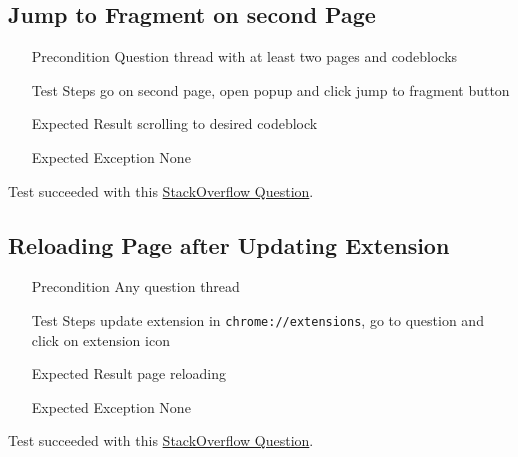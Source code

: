\documentclass{report}
\begin{document}
\subsection*{Jump to Fragment on second Page}
\begin{itemize}
	\item[Precondition] Question thread with at least two pages and codeblocks
	\item[Test Steps] go on second page, open popup and click jump to fragment button
	\item[Expected Result] scrolling to desired codeblock
	\item[Expected Exception] None
\end{itemize}
Test succeeded with this \href{https://stackoverflow.com/questions/221294/how-do-you-get-a-timestamp-in-javascript?page=2}{StackOverflow Question}.

\subsection*{Reloading Page after Updating Extension}
\begin{itemize}
	\item[Precondition] Any question thread
	\item[Test Steps] update extension in \texttt{chrome://extensions}, go to question and click on extension icon
	\item[Expected Result] page reloading
	\item[Expected Exception] None
\end{itemize}
Test succeeded with this \href{https://stackoverflow.com/questions/221294/how-do-you-get-a-timestamp-in-javascript?rq=1}{StackOverflow Question}.

\iffalse
\subsection*{}
\begin{itemize}
	\item[Precondition]
	\item[Test Steps]
	\item[Expected Result]
	\item[Expected Exception]
\end{itemize}
\fi
\end{document}
